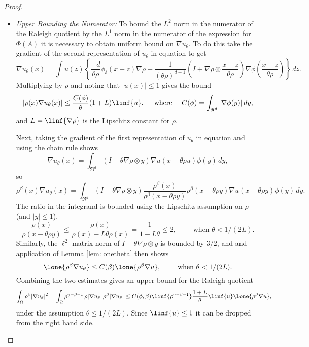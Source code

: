 \begin{proof}
\begin{itemize}
\item {\em Upper Bounding the Numerator:} To bound the $L^2$ norm in
  the numerator of the Raleigh quotient by the $L^1$ norm in the
  numerator of the expression for $\Phi(A)$ it is necessary to obtain
  uniform bound on $\nabla u_\theta$. To do this take the gradient of
  the second representation of $u_\theta$ in equation 
  to get
  $$
  \nabla u_\theta(x) 
  = \int u(z) \left\{
    \frac{-d}{\theta \rho} \phi_{\delta}(x-z) \nabla \rho
    + \frac{1}{(\theta \rho)^{d+1}} 
    \left( I 
      + \nabla \rho \otimes \frac{x-z}{\theta \rho} \right)
    \nabla \phi \left(\frac{x-z}{\theta \rho} \right) \right\} \, dz.
  $$
  Multiplying by $\rho$ and noting that $|u(x)| \leq 1$ gives the bound
  $$
  |\rho(x) \nabla u_\theta(x)|
  \leq \frac{C(\phi)}{\theta} (1+L) \linf{u},
  \quad \text{ where } \quad
  C(\phi) = \int_{\Re^d} |\nabla \phi(y)| \, dy,
  $$
  and $L = \linf{\nabla \rho}$ is the Lipschitz constant for $\rho$. 

  Next, taking the gradient of the first representation of $u_\theta$
  in equation  and using the chain rule shows
  $$
  \nabla u_\theta(x) 
  = \int_{\Re^d} 
  (I - \theta \nabla \rho \otimes y) \nabla u(x-\theta \rho u) \phi(y) \, dy,
  $$
  so
  $$
  \rho^\beta(x) \nabla u_\theta(x) 
  = \int_{\Re^d} 
  (I - \theta \nabla \rho \otimes y)
  \frac{\rho^\beta(x)}{\rho^\beta(x-\theta \rho y)}
  \rho^\beta(x-\theta \rho y) \nabla u(x-\theta \rho y) \phi(y) \, dy.
  $$
  The ratio in the integrand is bounded using the Lipschitz assumption
  on $\rho$ (and $|y| \leq 1$),
  \begin{equation} \label{eqn:ArhoRatio}
    \frac{\rho(x)}{\rho(x-\theta \rho y)}
    \leq \frac{\rho(x)}{\rho(x) - L \theta \rho(x)}
    = \frac{1}{1 - L \theta} \leq 2,
    \qquad \text{ when } \theta < 1 / (2L).
  \end{equation}
  Similarly, the $\ell^2$ matrix norm of $I - \theta \nabla \rho \otimes
  y$ is bounded by $3/2$, and and application of Lemma
  \ref{lem:lonetheta} then shows
  $$
  \lone{\rho^\beta \nabla u_\theta} 
  \leq C(\beta) \lone{\rho^\beta \nabla u},
  \qquad \text{ when } \theta < 1 / (2L).
  $$
  Combining the two estimates gives an upper bound for the Raleigh
  quotient 
  $$
  \int_\Omega \rho^\beta |\nabla u_\theta|^2
  = \int_\Omega \rho^{\gamma-\beta-1} \,
  \rho |\nabla u_\theta| \, \rho^\beta |\nabla u_\theta|
  \leq C(\phi,\beta) \linf{\rho^{\gamma-\beta-1}} \frac{1+L}{\theta} 
  \linf{u} \lone{\rho^\beta \nabla u},
  $$
  under the assumption $\theta \leq 1/(2L)$. Since $\linf{u} \leq 1$
  it can be dropped from the right hand side.


\end{itemize}
\end{proof}
